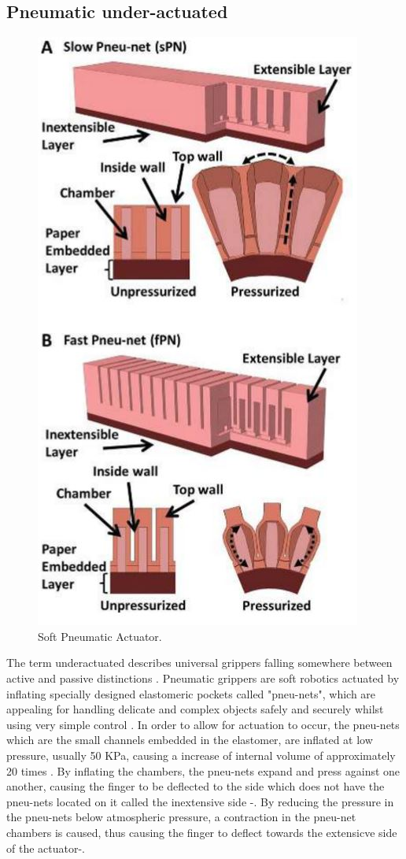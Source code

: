 \documentclass[11pt,twocolumn]{article}
\begin{document}
\subsection{Pneumatic under-actuated}
\begin{figure}[!h]
\centering
\includegraphics[scale=0.65]{Pneumatic1}
\caption{Soft Pneumatic Actuator.}
\label{pneumatic1}
\end{figure}
\noindent
The term underactuated describes universal grippers falling somewhere between active and passive distinctions \cite{amend2012positive}. Pneumatic grippers are soft robotics actuated by inflating specially designed elastomeric pockets called "pneu-nets", which are appealing for handling delicate and complex objects safely and securely whilst using very simple control \cite{mosadegh2014pneumatic}. In order to allow for actuation to occur, the pneu-nets which are the small channels embedded in the elastomer, are inflated at low pressure, usually 50 KPa, causing a increase of internal volume of approximately 20 times \cite{mosadegh2014pneumatic}. By inflating the chambers, the pneu-nets expand and press against one another, causing the finger to be deflected to the side which does not have the pneu-nets located on it called the inextensive side \cite{ilievski2011soft}-\cite{marchese2015recipe}. By reducing the pressure in the pneu-nets below atmospheric pressure, a contraction in the pneu-net chambers is caused, thus causing the finger to deflect towards the extensicve side of the actuator\cite{ilievski2011soft}-\cite{marchese2015recipe}.
\end{document}
